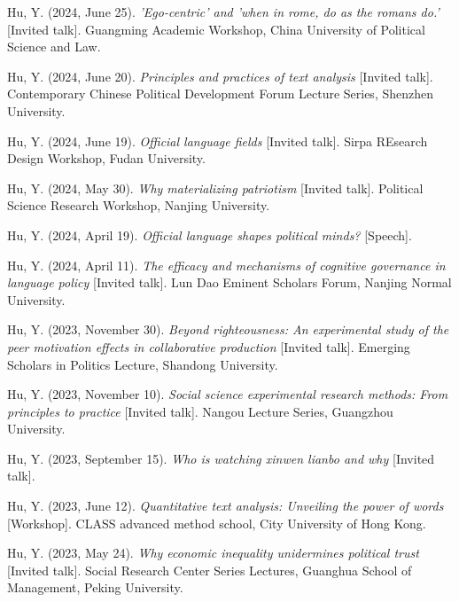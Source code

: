 \documentclass[
  12pt,
]
{article}
\newlength{\cslhangindent}
\newenvironment{CSLReferences}[2] %
 {\begin{list}{}{%
  \setlength{\itemindent}{0pt}
  \setlength{\leftmargin}{0pt}
  \setlength{\parsep}{0pt}
  \ifodd #1
   \setlength{\leftmargin}{\cslhangindent}
   \setlength{\itemindent}{-1\cslhangindent}
  \fi
  \setlength{\itemsep}{#2\baselineskip}}}
 {\end{list}}
\begin{document}
\label{refs-speech}
\begin{CSLReferences}{1}{0}
Hu, Y. (2024, June 25). \emph{'Ego-centric' and 'when in rome, do as the
romans do.'} {[}Invited talk{]}. Guangming Academic Workshop, China
University of Political Science and Law.

Hu, Y. (2024, June 20). \emph{Principles and practices of text analysis}
{[}Invited talk{]}. Contemporary Chinese Political Development Forum
Lecture Series, Shenzhen University.

Hu, Y. (2024, June 19). \emph{Official language fields} {[}Invited
talk{]}. Sirpa REsearch Design Workshop, Fudan University.

Hu, Y. (2024, May 30). \emph{Why materializing patriotism} {[}Invited
talk{]}. Political Science Research Workshop, Nanjing University.

Hu, Y. (2024, April 19). \emph{Official language shapes political
minds?} {[}Speech{]}.

Hu, Y. (2024, April 11). \emph{The efficacy and mechanisms of cognitive
governance in language policy} {[}Invited talk{]}. Lun Dao Eminent
Scholars Forum, Nanjing Normal University.

Hu, Y. (2023, November 30). \emph{Beyond righteousness: An experimental
study of the peer motivation effects in collaborative production}
{[}Invited talk{]}. Emerging Scholars in Politics Lecture, Shandong
University.

Hu, Y. (2023, November 10). \emph{Social science experimental research
methods: From principles to practice} {[}Invited talk{]}. Nangou Lecture
Series, Guangzhou University.

Hu, Y. (2023, September 15). \emph{Who is watching xinwen lianbo and
why} {[}Invited talk{]}.

Hu, Y. (2023, June 12). \emph{Quantitative text analysis: Unveiling the
power of words} {[}Workshop{]}. CLASS advanced method school, City
University of Hong Kong.

Hu, Y. (2023, May 24). \emph{Why economic inequality unidermines
political trust} {[}Invited talk{]}. Social Research Center Series
Lectures, Guanghua School of Management, Peking University.


\end{CSLReferences}
\end{document}
